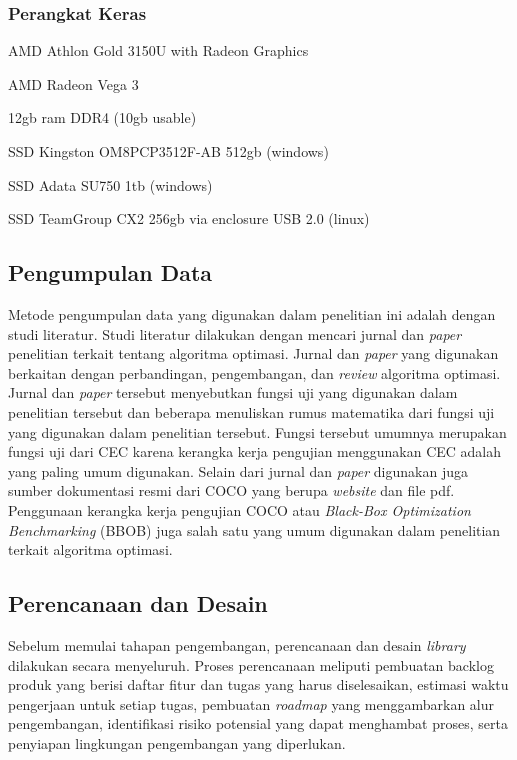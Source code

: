 \subsubsection{Perangkat Keras}
\begin{packed_enum}
  \item AMD Athlon Gold 3150U with Radeon Graphics
  \item AMD Radeon Vega 3
  \item 12gb ram DDR4 (10gb usable)
  \item SSD Kingston OM8PCP3512F-AB 512gb (windows)
  \item SSD Adata SU750 1tb (windows)
  \item SSD TeamGroup CX2 256gb via enclosure USB 2.0 (linux)
\end{packed_enum}

\subsection{Pengumpulan Data}
Metode pengumpulan data yang digunakan dalam penelitian ini adalah dengan studi literatur. Studi literatur dilakukan dengan mencari jurnal dan \textit{paper} penelitian terkait tentang algoritma optimasi. Jurnal dan \textit{paper} yang digunakan berkaitan dengan perbandingan, pengembangan, dan \textit{review} algoritma optimasi. Jurnal dan \textit{paper} tersebut menyebutkan fungsi uji yang digunakan dalam penelitian tersebut dan beberapa menuliskan rumus matematika dari fungsi uji yang digunakan dalam penelitian tersebut. Fungsi tersebut umumnya merupakan fungsi uji dari CEC karena kerangka kerja pengujian menggunakan CEC adalah yang paling umum digunakan. Selain dari jurnal dan \textit{paper} digunakan juga sumber dokumentasi resmi dari COCO yang berupa \textit{website} dan file pdf. Penggunaan kerangka kerja pengujian COCO atau \textit{Black-Box Optimization Benchmarking} (BBOB) juga salah satu yang umum digunakan dalam penelitian terkait algoritma optimasi.

\subsection{Perencanaan dan Desain}
Sebelum memulai tahapan pengembangan, perencanaan dan desain \textit{library} dilakukan secara menyeluruh. Proses perencanaan meliputi pembuatan backlog produk yang berisi daftar fitur dan tugas yang harus diselesaikan, estimasi waktu pengerjaan untuk setiap tugas, pembuatan \textit{roadmap} yang menggambarkan alur pengembangan, identifikasi risiko potensial yang dapat menghambat proses, serta penyiapan lingkungan pengembangan yang diperlukan.


